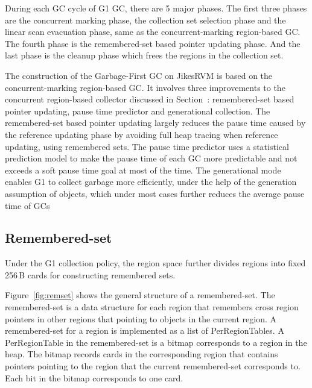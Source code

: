 During each GC cycle of G1 GC, there are 5 major phases.
The first three phases are the concurrent marking phase, the collection
set selection phase and the linear scan evacuation phase,
same as the concurrent-marking region-based GC.
The fourth phase is the remembered-set based pointer updating phase.
And the last phase is the cleanup phase which frees the regions in the collection set.

The construction of the Garbage-First GC on JikesRVM is based on the concurrent-marking
region-based GC.
It involves three improvements to the concurrent region-based collector discussed in Section~\label{sec:concmarkgc}:
remembered-set based pointer updating, pause time predictor and generational collection.
The remembered-set based pointer updating largely reduces the pause time caused by
the reference updating phase by avoiding full heap tracing when reference updating,
using remembered sets. The pause time predictor uses a statistical prediction model to make the pause time of each
GC more predictable and not exceeds a soft pause time goal at most of the time.
The generational mode enables G1 to collect garbage more efficiently, under the help
of the generation assumption of objects, which under most cases
further reduces the average pause  time of GCs

\subsection{Remembered-set}

Under the G1 collection policy, the region space further divides regions into fixed 256\,B cards for constructing remembered sets.

Figure~\ref{fig:remset} shows the general structure of a remembered-set. The remembered-set is a data structure for each region that remembers cross
region pointers in other regions that pointing to objects in the current region.
A remembered-set for a region is implemented as a list of PerRegionTables.
A PerRegionTable in the remembered-set is a bitmap corresponds to a region in the heap.
The bitmap records cards in the corresponding region that contains pointers pointing to the
region that the current remembered-set corresponds to. Each bit in the bitmap corresponds to one card.

\begin{figure*}
  \centering
  \texttt{[image: \{figs/remset.png]}}
  \caption{Remembered-Set Structure}
  \label{fig:remset}
\end{figure*}

